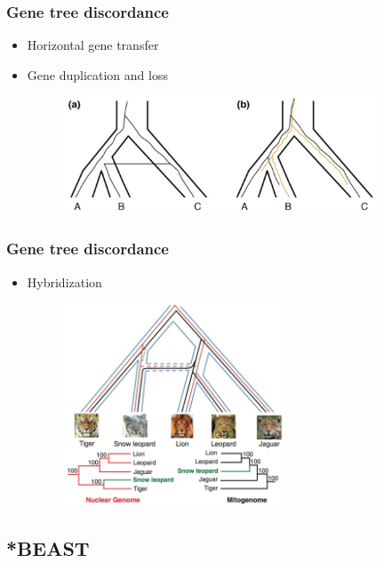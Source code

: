 \begin{frame}\frametitle{Gene tree discordance}
	\begin{itemize}
		\item Horizontal gene transfer
		\item Gene duplication and loss
		\begin{figure}[h!]
 			\includegraphics[height=3.5cm]{figures/HGTandDuplicationLoss}
		\end{figure}
	\end{itemize}
\end{frame}

\begin{frame}\frametitle{Gene tree discordance}
	\begin{itemize}
		\item Hybridization
		\begin{figure}[h!]
 			\includegraphics[height=6cm]{figures/hybridization}
		\end{figure}
	\end{itemize}
\end{frame}

\subsection{*BEAST}

